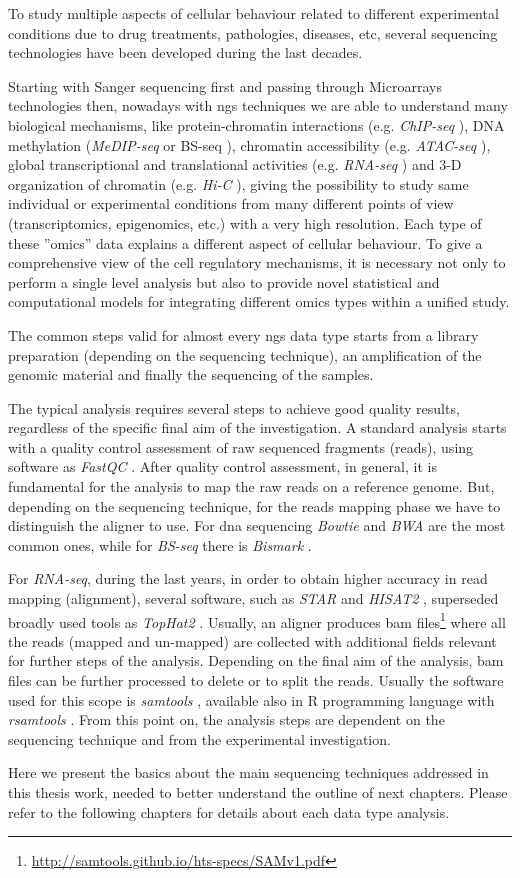 To study multiple aspects of cellular behaviour related to different experimental conditions due to drug treatments, pathologies, diseases, etc, several sequencing technologies have been developed during the last decades.

Starting with Sanger sequencing first and passing through Microarrays technologies then, nowadays with \gls{ngs} techniques we are able to understand many biological mechanisms, like protein-chromatin interactions (e.g. \textit{ChIP-seq} \cite{Park2009}), DNA methylation (\textit{MeDIP-seq} or BS-seq \cite{Frommer1992}), chromatin accessibility (e.g. \textit{ATAC-seq} \cite{Buenrostro2013}), global transcriptional and translational activities (e.g. \textit{RNA-seq} \cite{Wang2009}) and 3-D organization of chromatin (e.g. \textit{Hi-C} \cite{VanBerkum2010}), giving the possibility to study same individual or experimental conditions from many different points of view (transcriptomics, epigenomics, etc.) with a very high resolution. Each type of these ''omics'' data explains a different aspect of cellular behaviour. 
To give a comprehensive view of the cell regulatory mechanisms, it is necessary not only to perform a single level analysis but also to provide novel statistical and computational models for integrating different omics types within a unified study.

The common steps valid for almost every \gls{ngs} data type starts from a library preparation (depending on the sequencing technique), an amplification of the genomic material and finally the sequencing of the samples.

The typical analysis requires several steps to achieve good quality results, regardless of the specific final aim of the investigation.
A standard analysis starts with a quality control assessment of raw sequenced fragments (reads), using software as \textit{FastQC} \cite{Andrews2010}.
After quality control assessment, in general, it is fundamental for the analysis to map the raw reads on a reference genome. 
But, depending on the sequencing technique, for the reads mapping phase we have to distinguish the aligner to use.
For \gls{dna} sequencing \textit{Bowtie} \cite{Langmead2009, Langmead2012} and \textit{BWA} \cite{Li2010, Li2009b} are the most common ones, while for \textit{BS-seq} there is \textit{Bismark} \cite{Krueger2011}.

For \textit{RNA-seq}, during the last years, in order to obtain higher accuracy in read mapping (alignment), several software, such as \textit{STAR} \cite{Dobin2013} and \textit{HISAT2} \cite{Kim2015}, superseded broadly used tools as \textit{TopHat2} \cite{Kim2013}.
Usually, an aligner produces \gls{bam} files\footnote{\url{http://samtools.github.io/hts-specs/SAMv1.pdf}} \cite{Li2009} where all the reads (mapped and un-mapped) are collected with additional fields relevant for further steps of the analysis.
Depending on the final aim of the analysis, \gls{bam} files can be further processed to delete or to split the reads. 
Usually the software used for this scope is \textit{samtools} \cite{Li2009, Li2011}, available also in R programming language with \textit{rsamtools} \cite{Morgan}.
From this point on, the analysis steps are dependent on the sequencing technique and from the experimental investigation.

Here we present the basics about the main sequencing techniques addressed in this thesis work, needed to better understand the outline of next chapters.
Please refer to the following chapters for details about each data type analysis.